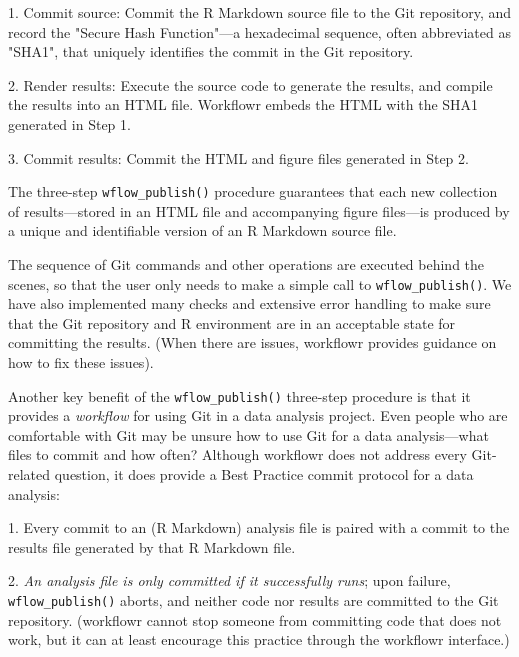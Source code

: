 \documentclass[9pt,a4paper]{extarticle}
\begin{document}
1. Commit source: Commit the R Markdown source file to the Git
repository, and record the "Secure Hash Function"—a hexadecimal
sequence, often abbreviated as "SHA1", that uniquely identifies the
commit in the Git repository.

2. Render results: Execute the source code to generate the results, and
compile the results into an HTML file. Workflowr embeds the HTML with
the SHA1 generated in Step 1.

3. Commit results: Commit the HTML and figure files generated in Step 2.

The three-step \verb|wflow_publish()| procedure guarantees that each new
collection of results—stored in an HTML file and accompanying figure
files—is produced by a unique and identifiable version of an R Markdown
source file.

The sequence of Git commands and other operations are executed behind
the scenes, so that the user only needs to make a simple call to
\verb|wflow_publish()|. We have also implemented many checks and extensive
error handling to make sure that the Git repository and R environment
are in an acceptable state for committing the results. (When there are
issues, workflowr provides guidance on how to fix these issues).

Another key benefit of the \verb|wflow_publish()| three-step procedure is that
it provides a \textit{workflow} for using Git in a data analysis
project. Even people who are comfortable with Git may be unsure how to
use Git for a data analysis—what files to commit and how often? Although
workflowr does not address every Git-related question, it does provide a
Best Practice commit protocol for a data analysis:

1. Every commit to an (R Markdown) analysis file is paired with a commit
to the results file generated by that R Markdown file.

2. \textit{An analysis file is only committed if it successfully runs};
upon failure, \verb|wflow_publish()| aborts, and neither code nor results are
committed to the Git repository. (workflowr cannot stop someone from
committing code that does not work, but it can at least encourage this
practice through the workflowr interface.)
\end{document}
